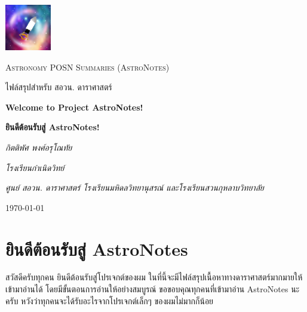 \documentclass[12pt, a4paper, oneside]{article}
\begin{document}
\pagestyle{fancy}
\fancyhf{}
\cfoot{\thepage}

\begin{titlepage}
    \centering
    
    \includegraphics[width=0.15\textwidth]{img/mzpfp2.jpg}
    \par\vspace{1cm}
	{\Large \textsc{Astronomy POSN Summaries (AstroNotes)}\par}
    \vspace{0.25cm}
	{\Large \textsc{ไฟล์สรุปสำหรับ สอวน. ดาราศาสตร์}\par}

	\vspace{2cm}
	{\LARGE\bfseries Welcome to Project AstroNotes!\par}
    \vspace{0.25cm}
    {\LARGE\bfseries ยินดีต้อนรับสู่ AstroNotes!\par}

	\vspace{1cm}
	{\Large\itshape กิตติพัศ พงศ์อรุโณทัย\par}
    \vspace{0.25cm}
    {\large\itshape โรงเรียนกำเนิดวิทย์\par}
    {\itshape ศูนย์ สอวน. ดาราศาสตร์ โรงเรียนมหิดลวิทยานุสรณ์ และโรงเรียนสวนกุหลาบวิทยาลัย}
	\vfill
	{\large \today\par}
\end{titlepage}

\section{ยินดีต้อนรับสู่ AstroNotes}
สวัสดีครับทุกคน ยินดีต้อนรับสู่โปรเจกต์ของผม ในที่นี้จะมีไฟล์สรุปเนื้อหาทางดาราศาสตร์มากมายให้เข้ามาอ่านได้ โดยมีขั้นตอนการอ่านให้อย่างสมบูรณ์
ขอขอบคุณทุกคนที่เข้ามาอ่าน AstroNotes นะครับ หวังว่าทุกคนจะได้รับอะไรจากโปรเจกต์เล็กๆ ของผมไม่มากก็น้อย
\end{document}

